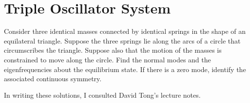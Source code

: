 \documentclass[11pt]{article}
\newenvironment{statement}
{
    \color{darkgray}
    \ignorespaces
}
{
    \smallskip
}
\newenvironment{solution}
{
    \paragraph{Solution.}
    \ignorespaces
}
{
    \bigskip
}
\begin{document}
%


\section{Triple Oscillator System}
\begin{statement}
	Consider three identical masses connected by identical springs in the shape of an equilateral triangle.  Suppose the three springs lie along the arcs of a circle that circumscribes the triangle.  Suppose also that the motion of the masses is constrained to move along the circle.  Find the normal modes and the eigenfrequencies about the equilibrium state.  If there is a zero mode, identify the associated continuous symmetry.
\end{statement}

%

	
In writing these solutions, I consulted David Tong's lecture notes.
\end{document}
